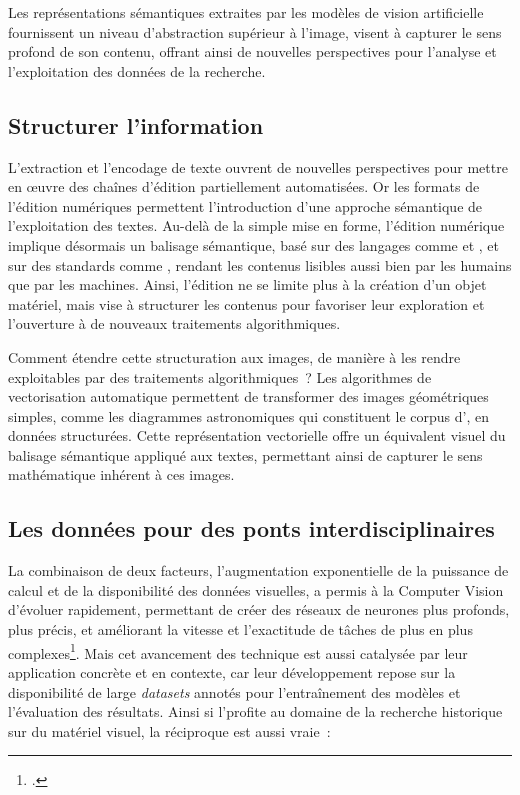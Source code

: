 Les représentations sémantiques extraites par les modèles de vision artificielle fournissent un niveau d'abstraction supérieur à l'image, visent à capturer le sens profond de son contenu, offrant ainsi de nouvelles perspectives pour l'analyse et l'exploitation des données de la recherche.

\subsection{Structurer l'information}

L'extraction et l'encodage de texte ouvrent de nouvelles perspectives pour mettre en œuvre des chaînes d'édition partiellement automatisées. Or les formats de l'édition numériques permettent l'introduction d'une approche sémantique de l'exploitation des textes. Au-delà de la simple mise en forme, l'édition numérique implique désormais un balisage sémantique, basé sur des langages comme \xml et \html, et sur des standards comme \tei, rendant les contenus lisibles aussi bien par les humains que par les machines. Ainsi, l'édition ne se limite plus à la création d'un objet matériel, mais vise à structurer les contenus pour favoriser leur exploration et l'ouverture à de nouveaux traitements algorithmiques.

Comment étendre cette structuration aux images, de manière à les rendre exploitables par des traitements algorithmiques~? Les algorithmes de vectorisation automatique permettent de transformer des images géométriques simples, comme les diagrammes astronomiques qui constituent le corpus d'\eida, en données structurées. Cette représentation vectorielle offre un équivalent visuel du balisage sémantique appliqué aux textes, permettant ainsi de capturer le sens mathématique inhérent à ces images.

\subsection{Les données pour des ponts interdisciplinaires}

La combinaison de deux facteurs, l'augmentation exponentielle de la puissance de calcul et de la disponibilité des données visuelles, a permis à la Computer Vision d'évoluer rapidement, permettant de créer des réseaux de neurones plus profonds, plus précis, et améliorant la vitesse et l'exactitude de tâches de plus en plus complexes\footcite{klinke_big_2016}. Mais cet avancement des technique est aussi catalysée par leur application concrète et en contexte, car leur développement repose sur la disponibilité de large \textit{datasets} annotés pour l'entraînement des modèles et l'évaluation des résultats. Ainsi si l'\ia profite au domaine de la recherche historique sur du matériel visuel, la réciproque est aussi vraie~: 

